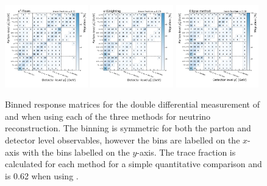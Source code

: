 \begin{figure}[htp]
    \includegraphics[width=0.32\textwidth]{Figures/neutrino_unfolding/unfolding/unfold_top_pt_transformer_encoder.pdf}
    \includegraphics[width=0.32\textwidth]{Figures/neutrino_unfolding/unfolding/unfold_top_pt_nu_weighting.pdf}
    \includegraphics[width=0.32\textwidth]{Figures/neutrino_unfolding/unfolding/unfold_top_pt_nu_ellipse.pdf}
    \caption{Binned response matrices for the double differential measurement of \mttbar and \pttop when using each of the three methods for neutrino reconstruction. The binning is symmetric for both the parton and detector level observables, however the \mttbar bins are labelled on the $x$-axis with the \pttop bins labelled on the $y$-axis.
    The trace fraction is calculated for each method for a simple quantitative comparison and is 0.62 when using \vtruth.}
    \label{fig:unfold_pttop}
\end{figure}

